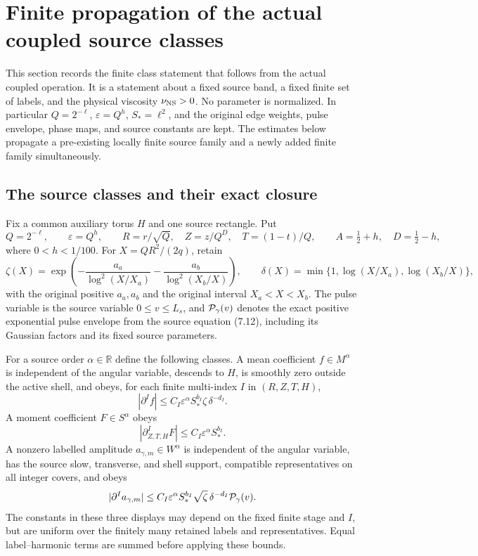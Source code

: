 \section{Finite propagation of the actual coupled source classes}
\label{mccp:section}

This section records the finite class statement that follows from the
actual coupled operation. It is a statement about a fixed source band,
a fixed finite set of labels, and the physical viscosity
$\nu_{\rm NS}>0$. No parameter is normalized. In particular
$Q=2^{-\ell}$, $\varepsilon=Q^h$, $S_* = \ell^2$, and the original
edge weights, pulse envelope, phase maps, and source constants are kept.
The estimates below propagate a pre-existing locally finite source family
and a newly added finite family simultaneously.

\subsection{The source classes and their exact closure}

Fix a common auxiliary torus $H$ and one source rectangle. Put
\[
 Q=2^{-\ell},\qquad \varepsilon=Q^h,\qquad
 R=r/\sqrt Q,\quad Z=z/Q^D,\quad T=(1-t)/Q,
 \qquad A=\tfrac12+h,\quad D=\tfrac12-h,
\]
where $0<h<1/100$. For $X=QR^2/(2q)$, retain
\[
 \zeta(X)=\exp\!\left(-\frac{a_a}{\log^2(X/X_a)}
       -\frac{a_b}{\log^2(X_b/X)}\right),\qquad
 \delta(X)=\min\{1,\log(X/X_a),\log(X_b/X)\},
\]
with the original positive $a_a,a_b$ and the original interval
$X_a<X<X_b$. The pulse variable is the source variable
$0\leq v\leq L_s$, and ${\cal P}_\gamma(v)$ denotes the exact positive
exponential pulse envelope from the source equation (7.12), including
its Gaussian factors and its fixed source parameters.

For a source order $\alpha\in\mathbb R$ define the following classes.
A mean coefficient $f\in M^\alpha$ is independent of the angular
variable, descends to $H$, is smoothly zero outside the active shell,
and obeys, for each finite multi-index $I$ in $(R,Z,T,H)$,
\begin{equation}\label{mccp:Mclass}
 |\partial^I f|\le C_I\varepsilon^\alpha S_*^{b_I}
                  \zeta\,\delta^{-d_I}.
\end{equation}
A moment coefficient $F\in S^\alpha$ obeys
\begin{equation}\label{mccp:Sclass}
 |\partial_{Z,T,H}^I F|\le C_I\varepsilon^\alpha S_*^{b_I}.
\end{equation}
A nonzero labelled amplitude $a_{\gamma,m}\in W^\alpha$ is independent
of the angular variable, has the source slow, transverse, and shell
support, compatible representatives on all integer covers, and obeys
\begin{equation}\label{mccp:Wclass}
 |\partial^I a_{\gamma,m}|
 \le C_I\varepsilon^\alpha S_*^{b_I}
       \sqrt\zeta\,\delta^{-d_I}{\cal P}_\gamma(v).
\end{equation}
The constants in these three displays may depend on the fixed finite
stage and $I$, but are uniform over the finitely many retained labels and
representatives. Equal label--harmonic terms are summed before applying
these bounds.

